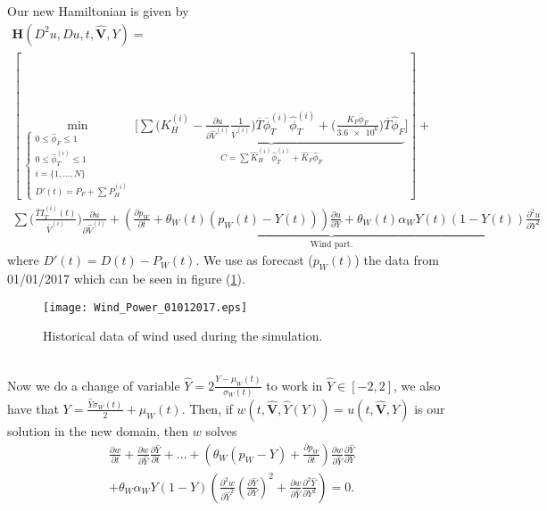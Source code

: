 \documentclass[12pt]{article}
\theoremstyle{definition}
\theoremstyle{remark}
\begin{document}
Our new Hamiltonian is given by
\begin{multline*}
\mathbf{H}(D^2u,Du,t,\bm{\hat{V}},Y)=\\
\left[\min_{\begin{cases}
0\leq\hat{\phi}_F\leq1\\
0\leq\hat{\phi}_T^{(i)}\leq1\\
i=\{1,\dots,N\}\\
D'(t)=P_F+\sum P_H^{(i)}
\end{cases}}\Bigg[\underbrace{\sum\Bigg(K_H^{(i)}-\frac{\partial u}{\partial \hat{V}^{(i)}}\frac{1}{\overline{V}^{(i)}}\Bigg)\overline{T}\overline{\phi}_T^{(i)}\hat{\phi}_T^{(i)}+\Bigg(\frac{K_F\overline{\phi}_F}{\num{3.6e6}}\Bigg)\overline{T}\hat{\phi}_F}_{C=\sum\hat{K}_H^{(i)}\hat{\phi}_T^{(i)}+\hat{K}_F\hat{\phi}_F}\Bigg]\right]+\\
\sum\Bigg(\frac{\overline{T}I_T^{(i)}(t)}{\overline{V}^{(i)}}\Bigg)\frac{\partial u}{\partial \hat{V}^{(i)}}+\underbrace{\left(\frac{\partial p_W}{\partial t}+\theta_W(t)(p_W(t)-Y(t))\right)\frac{\partial u}{\partial Y}+\theta_W(t)\alpha_WY(t)(1-Y(t))\frac{\partial^2u}{\partial Y^2}}_{\text{Wind part.}}
\end{multline*}
where $D'(t)=D(t)-P_W(t)$. We use as forecast ($p_W(t)$) the data from 01/01/2017 which can be seen in figure (\ref{wind}).
\begin{figure}[ht!]
\centering
\texttt{[image: Wind\_Power\_01012017.eps]}
\caption{Historical data of wind used during the simulation.}
\label{wind}
\end{figure}\\
Now we do a change of variable $\hat{Y}=2\frac{Y-\mu_W(t)}{\sigma_W(t)}$ to work in $\hat{Y}\in[-2,2]$, we also have that $Y=\frac{\hat{Y}\sigma_W(t)}{2}+\mu_W(t)$. Then, if $w(t,\bm{\hat{V}},\hat{Y}(Y))=u(t,\bm{\hat{V}},Y)$ is our solution in the new domain, then $w$ solves
\begin{multline*}
\frac{\partial w}{\partial t}+\frac{\partial w}{\partial \hat{Y}}\frac{\partial\hat{Y}}{\partial t}+\dots+\left(\theta_W(p_W-Y)+\frac{\partial p_W}{\partial t}\right)\frac{\partial w}{\partial\hat{Y}}\frac{\partial\hat{Y}}{\partial Y}\\
+\theta_W\alpha_WY(1-Y)\left(\frac{\partial^2w}{\partial\hat{Y}^2}\left(\frac{\partial\hat{Y}}{\partial Y}\right)^2+\frac{\partial w}{\partial\hat{Y}}\frac{\partial^2\hat{Y}}{\partial Y^2}\right)=0.
\end{multline*}
\end{document}
